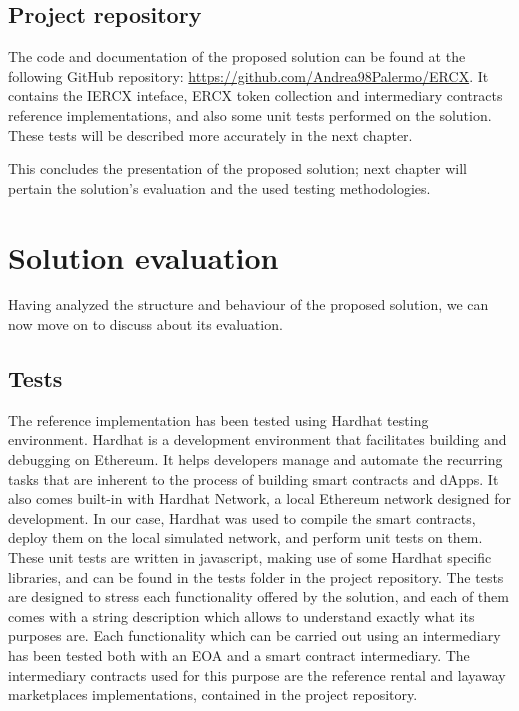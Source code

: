 \documentclass[english, LaM, oneside]{sapthesis}%
\begin{document}
\section{Project repository}
The code and documentation of the proposed solution can be found at the following GitHub repository: \url{https://github.com/Andrea98Palermo/ERCX}. It contains the IERCX inteface,  ERCX token collection and intermediary contracts reference implementations, and also some unit tests performed on the solution. These tests will be described more accurately in the next chapter.

\bigskip
\bigskip
This concludes the presentation of the proposed solution; next chapter will pertain the solution's evaluation and the used testing methodologies.


\chapter{Solution evaluation}
\label{chap:3}
Having analyzed the structure and behaviour of the proposed solution, we can now move on to discuss about its evaluation.

\section{Tests}
The reference implementation has been tested using Hardhat\cite{ref:hardhat} testing environment. Hardhat is a development environment that facilitates building and debugging on Ethereum. It helps developers manage and automate the recurring tasks that are inherent to the process of building smart contracts and dApps. It also comes built-in with Hardhat Network, a local Ethereum network designed for development. \newline
In our case, Hardhat was used to compile the smart contracts, deploy them on the local simulated network, and perform unit tests on them. These unit tests are written in javascript, making use of some Hardhat specific libraries, and can be found in the tests folder in the project repository. \newline
The tests are designed to stress each functionality offered by the solution, and each of them comes with a string description which allows to understand exactly what its purposes are. Each functionality which can be carried out using an intermediary has been tested both with an EOA and a smart contract intermediary. The intermediary contracts used for this purpose are the reference rental and layaway marketplaces implementations, contained in the project repository.
\end{document}
